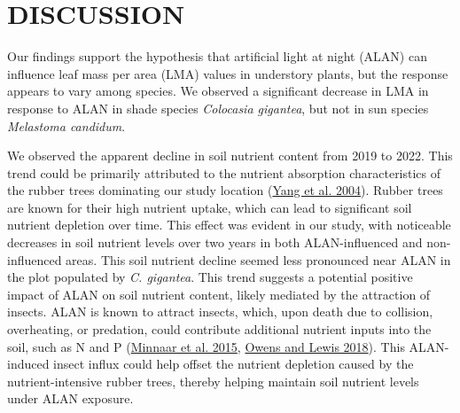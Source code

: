 \documentclass[
  12pt,
  letterpaper,
  DIV=11,
  numbers=noendperiod]{scrartcl}
\begin{document}
\hypertarget{discussion}{%
\section{DISCUSSION}\label{discussion}}

Our findings support the hypothesis that artificial light at night
(ALAN) can influence leaf mass per area (LMA) values in understory
plants, but the response appears to vary among species. We observed a
significant decrease in LMA in response to ALAN in shade species
\emph{Colocasia gigantea}, but not in sun species \emph{Melastoma
candidum}.

We observed the apparent decline in soil nutrient content from 2019 to
2022. This trend could be primarily attributed to the nutrient
absorption characteristics of the rubber trees dominating our study
location (\protect\hyperlink{ref-Yang2004}{Yang et al. 2004}). Rubber
trees are known for their high nutrient uptake, which can lead to
significant soil nutrient depletion over time. This effect was evident
in our study, with noticeable decreases in soil nutrient levels over two
years in both ALAN-influenced and non-influenced areas. This soil
nutrient decline seemed less pronounced near ALAN in the plot populated
by \emph{C. gigantea}. This trend suggests a potential positive impact
of ALAN on soil nutrient content, likely mediated by the attraction of
insects. ALAN is known to attract insects, which, upon death due to
collision, overheating, or predation, could contribute additional
nutrient inputs into the soil, such as N and P
(\protect\hyperlink{ref-Minnaar2015}{Minnaar et al. 2015},
\protect\hyperlink{ref-Owens2018}{Owens and Lewis 2018}). This
ALAN-induced insect influx could help offset the nutrient depletion
caused by the nutrient-intensive rubber trees, thereby helping maintain
soil nutrient levels under ALAN exposure.
\end{document}
